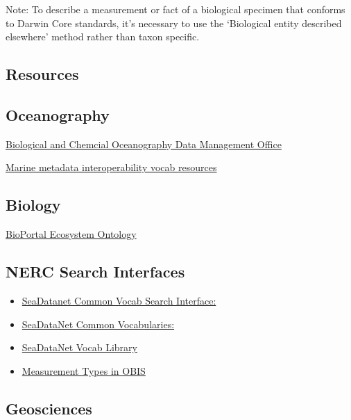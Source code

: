 \documentclass[
]{book}
\begin{document}
Note: To describe a measurement or fact of a biological specimen that conforms to Darwin Core standards, it's necessary to use the `Biological entity described elsewhere' method rather than taxon specific.

\hypertarget{resources}{%
\subsection{Resources}\label{resources}}

\hypertarget{oceanography}{%
\subsection{Oceanography}\label{oceanography}}

\href{http://www.bco-dmo.org/}{Biological and Chemcial Oceanography Data Management Office}

\href{https://mmisw.org/ont/\#/}{Marine metadata interoperability vocab resources}

\hypertarget{biology}{%
\subsection{Biology}\label{biology}}

\href{http://bioportal.bioontology.org/ontologies/ECSO}{BioPortal Ecosystem Ontology}

\hypertarget{nerc-search-interfaces}{%
\subsection{NERC Search Interfaces}\label{nerc-search-interfaces}}

\begin{itemize}
\item
  \href{http://seadatanet.maris2.nl/v_bodc_vocab_v2/welcome.asp}{SeaDatanet Common Vocab Search Interface:}
\item
  \href{https://www.seadatanet.org/Standards/Common-Vocabularies/}{SeaDataNet Common Vocabularies:}
\item
  \href{http://seadatanet.maris2.nl/v_bodc_vocab_v2/vocab_relations.asp?lib=P08}{SeaDataNet Vocab Library}
\item
  \href{https://mof.obis.org/}{Measurement Types in OBIS}
\end{itemize}

\hypertarget{geosciences}{%
\subsection{Geosciences}\label{geosciences}}
\end{document}
